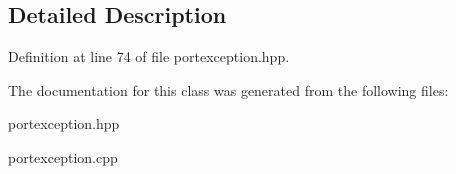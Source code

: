 \subsection{Detailed Description}


Definition at line 74 of file portexception.\+hpp.



The documentation for this class was generated from the following files\+:\begin{DoxyCompactItemize}
\item 
portexception.\+hpp\item 
portexception.\+cpp\end{DoxyCompactItemize}
